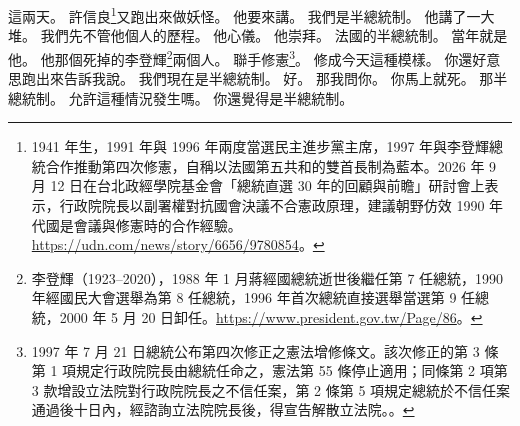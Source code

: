 \hypertarget{c01:cue:1150}{}這兩天。
\hypertarget{c01:cue:1151}{}許信良\footnote{1941 年生，1991 年與 1996 年兩度當選民主進步黨主席，1997 年與李登輝總統合作推動第四次修憲，自稱以法國第五共和的雙首長制為藍本。2026 年 9 月 12 日在台北政經學院基金會「總統直選 30 年的回顧與前瞻」研討會上表示，行政院院長以副署權對抗國會決議不合憲政原理，建議朝野仿效 1990 年代國是會議與修憲時的合作經驗。\url{https://udn.com/news/story/6656/9780854}。}又跑出來做妖怪。
\hypertarget{c01:cue:1152}{}他要來講。
\hypertarget{c01:cue:1153}{}我們是半總統制。
\hypertarget{c01:cue:1154}{}他講了一大堆。
\hypertarget{c01:cue:1155}{}我們先不管他個人的歷程。
\hypertarget{c01:cue:1156}{}他心儀。
\hypertarget{c01:cue:1157}{}他崇拜。
\hypertarget{c01:cue:1158}{}法國的半總統制。
\hypertarget{c01:cue:1159}{}當年就是他。
\hypertarget{c01:cue:1160}{}他那個死掉的李登輝\footnote{李登輝（1923–2020），1988 年 1 月蔣經國總統逝世後繼任第 7 任總統，1990 年經國民大會選舉為第 8 任總統，1996 年首次總統直接選舉當選第 9 任總統，2000 年 5 月 20 日卸任。\url{https://www.president.gov.tw/Page/86}。}兩個人。
\hypertarget{c01:cue:1161}{}聯手修憲\footnote{1997 年 7 月 21 日總統公布第四次修正之憲法增修條文。該次修正的第 3 條第 1 項規定行政院院長由總統任命之，憲法第 55 條停止適用；同條第 2 項第 3 款增設立法院對行政院院長之不信任案，第 2 條第 5 項規定總統於不信任案通過後十日內，經諮詢立法院院長後，得宣告解散立法院。\cite{pres325}。}。
\hypertarget{c01:cue:1162}{}修成今天這種模樣。
\hypertarget{c01:cue:1163}{}你還好意思跑出來告訴我說。
\hypertarget{c01:cue:1164}{}我們現在是半總統制。
\hypertarget{c01:cue:1165}{}好。
\hypertarget{c01:cue:1166}{}那我問你。
\hypertarget{c01:cue:1167}{}你馬上就死。
\hypertarget{c01:cue:1168}{}那半總統制。
\hypertarget{c01:cue:1169}{}允許這種情況發生嗎。
\hypertarget{c01:cue:1170}{}你還覺得是半總統制。

